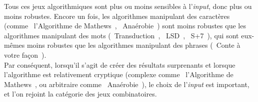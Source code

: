 \documentclass{article}
\begin{document}
					\vspace{2mm}
					Tous ces jeux algorithmiques sont plus ou moins sensibles à l'\textit{input}, donc plus ou moins robustes. Encore un fois, les algorithmes manipulant des caractères (comme \guillemotleft~l'Algorithme de Mathews~\guillemotright, \guillemotleft~Anaérobie~\guillemotright) sont moins robustes que les algorithmes manipulant des mots (\guillemotleft~Transduction~\guillemotright, \guillemotleft~LSD~\guillemotright, \guillemotleft~S+7~\guillemotright), qui sont eux-mêmes moins robustes que les algorithmes manipulant des phrases (\guillemotleft~Conte à votre façon~\guillemotright).\\
					Par conséquent, lorsqu'il s'agit de créer des résultats surprenants et lorsque l'algorithme est relativement cryptique (complexe comme \guillemotleft~l'Algorithme de Mathews~\guillemotright, ou arbitraire comme \guillemotleft~Anaérobie~\guillemotright), le choix de l'\textit{input} est important, et l'on rejoint la catégorie des jeux combinatoires.
				
				
\end{document}
